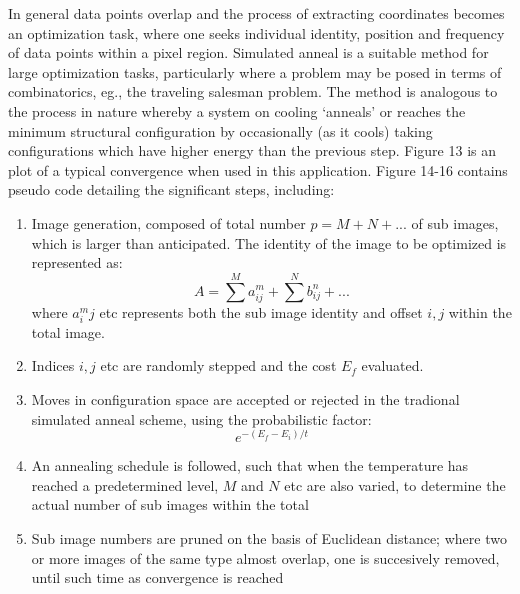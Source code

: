 \documentclass[12pt]{article}
\newcommand{\beq}{\begin{equation}}
\newcommand{\eeq}{\end{equation}}
\begin{document}
In general data points overlap and the process of extracting  coordinates becomes an optimization task, where one  seeks individual identity, position and frequency of data points within a pixel region. Simulated anneal is a suitable method for large optimization tasks, particularly where a problem may be posed in terms of combinatorics, eg., the traveling salesman problem. The method is analogous to the process in nature whereby a system on cooling ‘anneals’ or reaches the minimum structural configuration by occasionally (as it cools) taking configurations which have higher energy than the previous step. Figure 13 is an plot of a typical convergence when used in this application. Figure 14-16 contains pseudo code detailing the significant steps, including:
\begin{enumerate}
\item Image generation, composed of total number $p=M+N+...$ of sub images, which is larger than anticipated. The identity of the image to be optimized is represented as:
\beq A=\sum^M a^m_{ij}+\sum^N b^n_{ij} + ... \eeq
where $a^m_ij$ etc represents both the sub image identity and offset $i,j$ within the total image.
\item Indices $i,j$ etc are randomly stepped and the cost $E_f$ evaluated.
\item Moves in configuration space are accepted or rejected in the tradional simulated anneal scheme, using the probabilistic factor:
\beq e^{-(E_f-E_i)/t} \eeq
\item An annealing schedule is followed, such that when the temperature has reached a predetermined level, $M$ and $N$ etc are also varied, to determine the actual number of sub images within the total
\item Sub image numbers  are pruned on the basis of Euclidean distance; where two or more images of the same type almost overlap, one is succesively removed, until such time as convergence is reached
\end{enumerate}   
\end{document}
